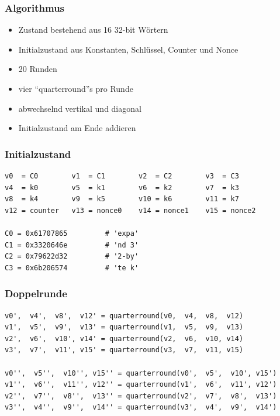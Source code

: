 \documentclass[ngerman]{beamer}
\begin{document}
\begin{frame}

    \frametitle{Algorithmus}


    \begin{itemize}
        \item Zustand bestehend aus 16 32-bit Wörtern
        \item Initialzustand aus Konstanten, Schlüssel, Counter und Nonce
        \item 20 Runden
        \item vier ``quarterround''s pro Runde
        \item abwechselnd vertikal und diagonal
        \item Initialzustand am Ende addieren
    \end{itemize}

\end{frame}



\begin{frame}[fragile]

    \frametitle{Initialzustand}


    \begin{lstlisting}
v0  = C0        v1  = C1        v2  = C2        v3  = C3
v4  = k0        v5  = k1        v6  = k2        v7  = k3
v8  = k4        v9  = k5        v10 = k6        v11 = k7
v12 = counter   v13 = nonce0    v14 = nonce1    v15 = nonce2

C0 = 0x61707865         # 'expa'
C1 = 0x3320646e         # 'nd 3'
C2 = 0x79622d32         # '2-by'
C3 = 0x6b206574         # 'te k'
    \end{lstlisting}


\end{frame}



\begin{frame}[fragile]

    \frametitle{Doppelrunde}


    \begin{lstlisting}[]
v0',  v4',  v8',  v12' = quarterround(v0,  v4,  v8,  v12)
v1',  v5',  v9',  v13' = quarterround(v1,  v5,  v9,  v13)
v2',  v6',  v10', v14' = quarterround(v2,  v6,  v10, v14)
v3',  v7',  v11', v15' = quarterround(v3,  v7,  v11, v15)

v0'',  v5'',  v10'', v15'' = quarterround(v0',  v5',  v10', v15')
v1'',  v6'',  v11'', v12'' = quarterround(v1',  v6',  v11', v12')
v2'',  v7'',  v8'',  v13'' = quarterround(v2',  v7',  v8',  v13')
v3'',  v4'',  v9'',  v14'' = quarterround(v3',  v4',  v9',  v14')
    \end{lstlisting}


\end{frame}
\end{document}
